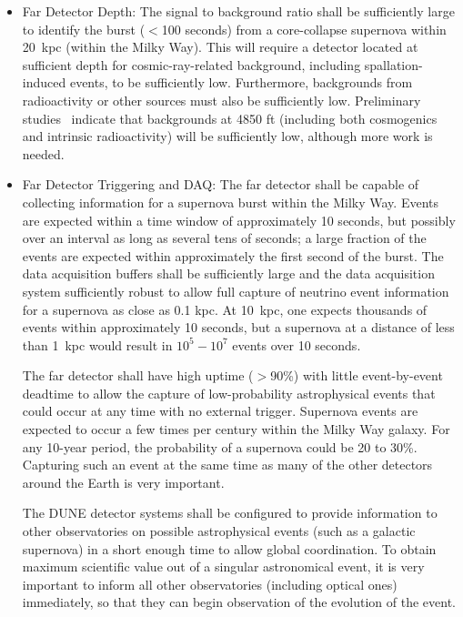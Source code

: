 \begin{itemize}

\item Far Detector Depth: The signal to background ratio shall be sufficiently large to identify the  burst ($<$100 seconds)  from a core-collapse supernova within 20~kpc (within the Milky Way). This will require a detector located at sufficient depth for cosmic-ray-related background, including spallation-induced events, to be sufficiently low.  Furthermore, backgrounds from radioactivity or other sources must also be sufficiently low.  Preliminary studies~\cite{gehman} indicate that backgrounds at 4850 ft (including both cosmogenics and intrinsic radioactivity) will be sufficiently low, although more work is needed. 

\item Far Detector Triggering and DAQ:  The far detector shall be capable of collecting information for a supernova burst within the Milky Way.  Events are expected within a time window of approximately 10 seconds, but possibly over an interval as long as several tens of seconds; a large fraction of the events are expected within approximately the first second of the burst.
The data acquisition buffers shall be sufficiently large and the data acquisition system sufficiently robust to allow full capture of neutrino event information for a supernova as close as 0.1 kpc.
At 10~kpc, one expects thousands of events within approximately 10 seconds, but a supernova at a distance of less than 1~kpc would result in $10^5-10^7$  events over 10 seconds.    

The far detector shall have high uptime ($>$90\%) with little event-by-event deadtime to allow the capture of low-probability astrophysical events that could occur at any time with no external trigger. 
Supernova events are expected to occur a few times per century within the Milky Way galaxy. For any 10-year period, the probability of a supernova could be 20 to 30\%.  Capturing such an event at the same time as many of the other detectors around the Earth is very important.  

The DUNE detector systems shall be configured to provide  information to other observatories on possible astrophysical events (such as a galactic supernova) in a short enough time to allow global coordination.   
To obtain maximum scientific value out of a singular astronomical event, it is very important to inform all other observatories (including optical ones) immediately, so that they can begin observation of the evolution of the event. 


\end{itemize}
